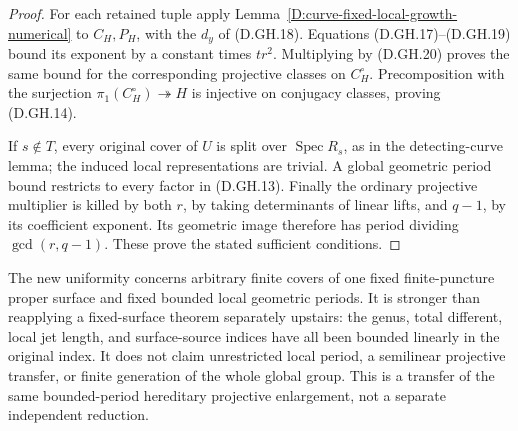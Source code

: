 \begin{proof}
For each retained tuple apply
Lemma~\ref{D:curve-fixed-local-growth-numerical}
to \(C_H,P_H\), with the \(d_y\) of (D.GH.18).
Equations (D.GH.17)--(D.GH.19) bound its exponent
by a constant times \(t r^2\).
Multiplying by (D.GH.20) proves the same bound
for the corresponding projective classes on
\(C_H^\circ\). Precomposition with the surjection
\(\pi_1(C_H^\circ)\twoheadrightarrow H\) is injective
on conjugacy classes, proving (D.GH.14).

If \(s\notin T\), every original cover of \(U\)
is split over \(\operatorname{Spec}R_s\), as in
the detecting-curve lemma; the induced local
representations are trivial. A global geometric
period bound restricts to every factor in
(D.GH.13). Finally the ordinary projective
multiplier is killed by both \(r\), by taking
determinants of linear lifts, and \(q-1\), by
its coefficient exponent. Its geometric image
therefore has period dividing \(\gcd(r,q-1)\).
These prove the stated sufficient conditions.
\end{proof}

\begin{remark}
The new uniformity concerns arbitrary finite covers of
one fixed finite-puncture proper surface and fixed
bounded local geometric periods. It is stronger than
reapplying a fixed-surface theorem separately upstairs:
the genus, total different, local jet length, and
surface-source indices have all been bounded linearly
in the original index. It does not claim unrestricted
local period, a semilinear projective transfer, or
finite generation of the whole global group.
This is a transfer of the same bounded-period
hereditary projective enlargement, not a separate
independent reduction.
\end{remark}
